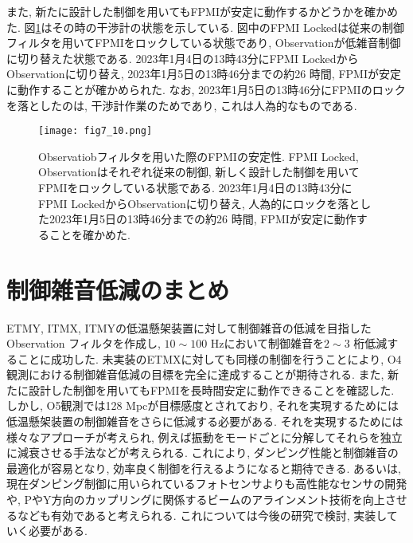 また, 新たに設計した制御を用いてもFPMIが安定に動作するかどうかを確かめた. 図\ref{fig7.10}はその時の干渉計の状態を示している. 図中のFPMI Lockedは従来の制御フィルタを用いてFPMIをロックしている状態であり, Observationが低雑音制御に切り替えた状態である. 2023年1月4日の13時43分にFPMI LockedからObservationに切り替え, 2023年1月5日の13時46分までの約26 時間, FPMIが安定に動作することが確かめられた. なお, 2023年1月5日の13時46分にFPMIのロックを落としたのは, 干渉計作業のためであり, これは人為的なものである.
\begin{figure}[H]
\begin{center}
\texttt{[image: fig7\_10.png]}
\caption[FPMIの安定性]{Observatiobフィルタを用いた際のFPMIの安定性. FPMI Locked, Observationはそれぞれ従来の制御, 新しく設計した制御を用いてFPMIをロックしている状態である. 2023年1月4日の13時43分にFPMI LockedからObservationに切り替え, 人為的にロックを落とした2023年1月5日の13時46分までの約26 時間, FPMIが安定に動作することを確かめた.}
\label{fig7.10}
\end{center}
\end{figure}

\section{制御雑音低減のまとめ}
ETMY, ITMX, ITMYの低温懸架装置に対して制御雑音の低減を目指したObservation フィルタを作成し, $10\sim100$ Hzにおいて制御雑音を$2\sim3$ 桁低減することに成功した.  未実装のETMXに対しても同様の制御を行うことにより, O4観測における制御雑音低減の目標を完全に達成することが期待される. また, 新たに設計した制御を用いてもFPMIを長時間安定に動作できることを確認した. \\
\quad しかし, O5観測では128 Mpcが目標感度とされており, それを実現するためには低温懸架装置の制御雑音をさらに低減する必要がある. それを実現するためには様々なアプローチが考えられ, 例えば振動をモードごとに分解してそれらを独立に減衰させる手法などが考えられる. これにより, ダンピング性能と制御雑音の最適化が容易となり, 効率良く制御を行えるようになると期待できる\cite{modal}. あるいは, 現在ダンピング制御に用いられているフォトセンサよりも高性能なセンサの開発や, PやY方向のカップリングに関係するビームのアラインメント技術を向上させるなども有効であると考えられる. これについては今後の研究で検討, 実装していく必要がある.








